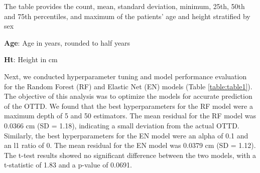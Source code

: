 \documentclass[11pt]{article}
\begin{document}
\begin{table}[h]
\caption{Descriptive statistics for male and female patients}
\label{table:table0}
\begin{threeparttable}
\renewcommand{\TPTminimum}{\linewidth}
\begin{tablenotes}
\footnotesize
\item The table provides the count, mean, standard deviation, minimum, 25th, 50th and 75th percentiles, and maximum of the patients' age and height stratified by sex
\item \textbf{Age}: Age in years, rounded to half years
\item \textbf{Ht}: Height in cm
\end{tablenotes}
\end{threeparttable}
\end{table}


Next, we conducted hyperparameter tuning and model performance evaluation for the Random Forest (RF) and Elastic Net (EN) models (Table \ref{table:table1}). The objective of this analysis was to optimize the models for accurate prediction of the OTTD. We found that the best hyperparameters for the RF model were a maximum depth of 5 and 50 estimators. The mean residual for the RF model was 0.0366 cm (SD = 1.18), indicating a small deviation from the actual OTTD. Similarly, the best hyperparameters for the EN model were an alpha of 0.1 and an l1 ratio of 0. The mean residual for the EN model was 0.0379 cm (SD = 1.12). The t-test results showed no significant difference between the two models, with a t-statistic of 1.83 and a p-value of 0.0691.
\end{document}

